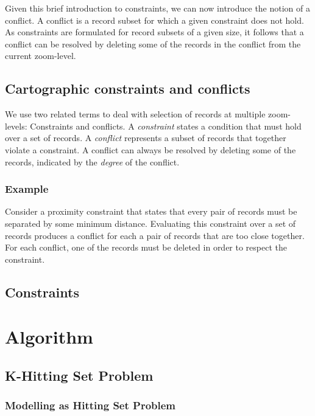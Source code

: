 Given this brief introduction to constraints, we can now introduce the notion of a conflict. 
A conflict is a record subset for which a given constraint does not hold. As constraints are formulated for record subsets of a given size, it follows that a conflict can be resolved by deleting some of the records in the conflict from the current zoom-level.


\subsection{Cartographic constraints and conflicts}

We use two related terms to deal with selection of records at multiple zoom-levels: Constraints and conflicts. A \emph{constraint} states a condition that must hold over a set of records. A \emph{conflict} represents a subset of records that together violate a constraint. A conflict can always be resolved by deleting some of the records, indicated by the \emph{degree} of the conflict.

\subsubsection{Example}
Consider a proximity constraint that states that every pair of records must be separated by some minimum distance. Evaluating this constraint over a set of records produces a conflict for each a pair of records that are too close together. For each conflict, one of the records must be deleted in order to respect the constraint.

\subsection{Constraints}






\section{Algorithm}

\subsection{K-Hitting Set Problem}

\subsubsection{Modelling as Hitting Set Problem}


